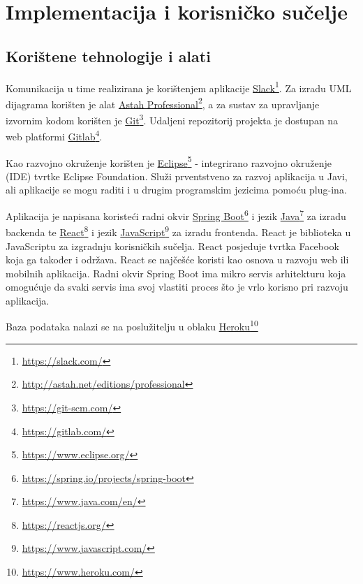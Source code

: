 \chapter{Implementacija i korisničko sučelje}
		
		
		\section{Korištene tehnologije i alati}
		
%			
			
			Komunikacija u time realizirana je korištenjem aplikacije \underline{Slack}\footnote{\url{https://slack.com/}}. Za izradu UML dijagrama korišten je alat \underline{Astah Professional}\footnote{\url{http://astah.net/editions/professional}}, a za sustav za upravljanje izvornim kodom korišten je \underline{Git}\footnote{\url{https://git-scm.com/}}. Udaljeni repozitorij projekta je dostupan na web platformi \underline{Gitlab}\footnote{\url{https://gitlab.com/}}.
			
			Kao razvojno okruženje korišten je \underline{Eclipse}\footnote{\url{https://www.eclipse.org/}} - integrirano razvojno okruženje (IDE) tvrtke Eclipse Foundation. Služi prventstveno za razvoj aplikacija u Javi, ali aplikacije se mogu raditi i u drugim programskim jezicima pomoću plug-ina.
			
			Aplikacija je napisana koristeći radni okvir \underline{Spring Boot}\footnote{\url{https://spring.io/projects/spring-boot}} i jezik \underline{Java}\footnote{\url{https://www.java.com/en/}} za izradu backenda te \underline{React}\footnote{\url{https://reactjs.org/}} i jezik \underline{JavaScript}\footnote{\url{https://www.javascript.com/}} za izradu frontenda. React je biblioteka u JavaScriptu za izgradnju korisničkih sučelja. React posjeduje tvrtka Facebook koja ga također i održava. React se najčešće koristi kao osnova u razvoju web ili mobilnih aplikacija. Radni okvir Spring Boot ima mikro servis arhitekturu koja omogućuje da svaki servis ima svoj vlastiti proces što je vrlo korisno pri razvoju aplikacija.
			
			Baza podataka nalazi se na poslužitelju u oblaku \underline{Heroku}\footnote{\url{https://www.heroku.com/}}
			
